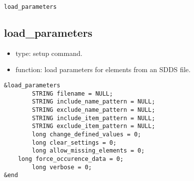 \documentclass[11pt]{article}
\begin{document}
\begin{latexonly}
\newpage
\begin{center}{\Large\verb|load_parameters|}\end{center}
\end{latexonly}
\subsection{load\_parameters}

\begin{itemize}
\item type: setup command.
\item function: load parameters for elements from an SDDS file.
\end{itemize}

\begin{verbatim}
&load_parameters
        STRING filename = NULL;
        STRING include_name_pattern = NULL;
        STRING exclude_name_pattern = NULL;
        STRING include_item_pattern = NULL;
        STRING exclude_item_pattern = NULL;
        long change_defined_values = 0;
        long clear_settings = 0;
        long allow_missing_elements = 0;
	long force_occurence_data = 0;
        long verbose = 0;
&end
\end{verbatim}
\end{document}

